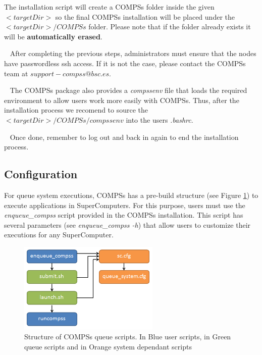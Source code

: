 The installation script will create a COMPSs folder inside the given $<targetDir>$ so the final COMPSs installation will be placed 
under the $<targetDir>/COMPSs$ folder. Please note that if the folder already exists it will be \textbf{automatically erased}.

~ \newline
After completing the previous steps, administrators must ensure that the nodes have passwordless ssh access. If it is not the case,
please contact the COMPSs team at $support-compss@bsc.es$.

~ \newline
The COMPSs package also provides a \textit{compssenv} file that loads the required environment to allow users work more easily
with COMPSs. Thus, after the installation process we recomend to source the $<targetDir>/COMPSs/compssenv$ into the 
users \textit{.bashrc}.

~ \newline
Once done, remember to log out and back in again to end the installation process.

\subsection{Configuration}
For queue system executions, COMPSs has a pre-build structure (see Figure \ref{fig:queue_scripts_structure}) to execute 
applications in SuperComputers. For this purpose, users must use the \textit{enqueue\_compss} script provided in the COMPSs installation.
This script has several parameters (see \textit{enqueue\_compss -h}) that allow users to customize their executions for any SuperComputer.

\begin{figure}[h!]
  \centering
    \includegraphics[width=0.6\textwidth]{./Sections/6_Supercomputers/Figures/queue_scripts_structure.png}
    \caption{Structure of COMPSs queue scripts. In Blue user scripts, in Green queue scripts and in Orange system dependant scripts}
    \label{fig:queue_scripts_structure}
\end{figure}

